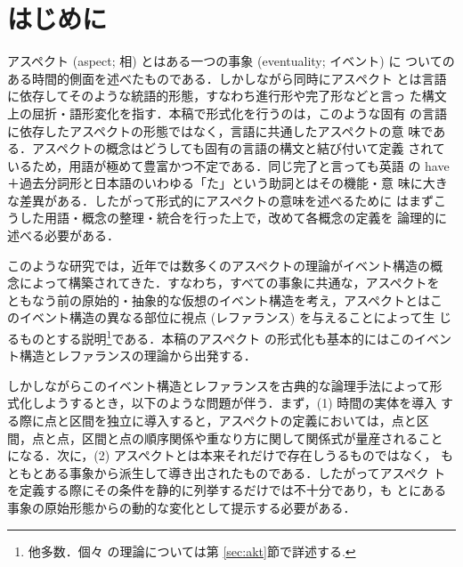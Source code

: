 


\maketitle


\section{はじめに}\label{sec:moti}

アスペクト (aspect; 相) とはある一つの事象 (eventuality; イベント) に
ついてのある時間的側面を述べたものである．しかしながら同時にアスペクト
とは言語に依存してそのような統語的形態，すなわち進行形や完了形などと言っ
た構文上の屈折・語形変化を指す．本稿で形式化を行うのは，このような固有
の言語に依存したアスペクトの形態ではなく，言語に共通したアスペクトの意
味である．アスペクトの概念はどうしても固有の言語の構文と結び付いて定義
されているため，用語が極めて豊富かつ不定である．同じ完了と言っても英語
の have ＋過去分詞形と日本語のいわゆる「た」という助詞とはその機能・意
味に大きな差異がある．したがって形式的にアスペクトの意味を述べるために
はまずこうした用語・概念の整理・統合を行った上で，改めて各概念の定義を
論理的に述べる必要がある．

このような研究では，近年では数多くのアスペクトの理論がイベント構造の概
念によって構築されてきた．すなわち，すべての事象に共通な，アスペクトを
ともなう前の原始的・抽象的な仮想のイベント構造を考え，アスペクトとはこ
のイベント構造の異なる部位に視点 (レファランス) を与えることによって生
じるものとする説明\footnote{ \cite{Moens88,Gunji92,Kamp93,Blackburn96,Terenziani93} 他多数．個々
の理論については第 \ref{sec:akt}節で詳述する.}である．本稿のアスペクト
の形式化も基本的にはこのイベント構造とレファランスの理論から出発する．

しかしながらこのイベント構造とレファランスを古典的な論理手法によって形
式化しようするとき，以下のような問題が伴う．まず，(1) 時間の実体を導入
する際に点と区間を独立に導入すると，アスペクトの定義においては，点と区
間，点と点，区間と点の順序関係や重なり方に関して関係式が量産されること
になる．次に，(2) アスペクトとは本来それだけで存在しうるものではなく，
もともとある事象から派生して導き出されたものである．したがってアスペク
トを定義する際にその条件を静的に列挙するだけでは不十分であり，も
とにある事象の原始形態からの動的な変化として提示する必要がある．

